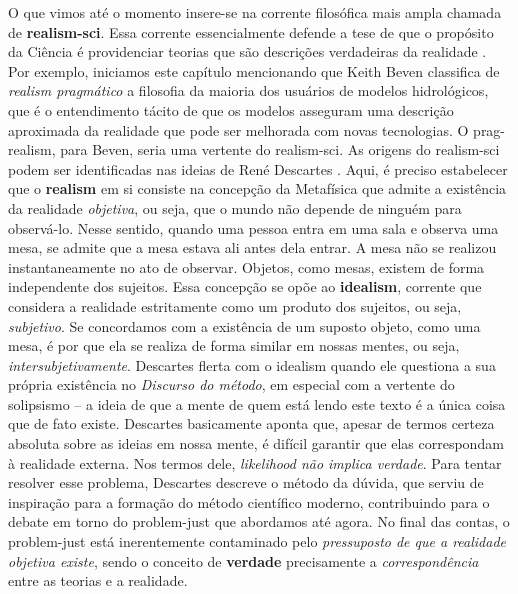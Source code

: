 \documentclass[./main.tex]{subfiles}
\begin{document}
\par O que vimos até o momento insere-se na corrente filosófica mais ampla chamada de \textbf{\gls{realism-sci}}. Essa corrente essencialmente defende a tese de que o propósito da Ciência é providenciar teorias que são descrições verdadeiras da realidade \cite{bas1980}. Por exemplo, iniciamos este capítulo mencionando que Keith Beven classifica de \textit{\gls{realism} pragmático} a filosofia da maioria dos usuários de modelos hidrológicos, que é o entendimento tácito de que os modelos asseguram uma descrição aproximada da realidade que pode ser melhorada com novas tecnologias. O \gls{prag-realism}, para Beven, seria uma vertente do \gls{realism-sci}. As origens do \gls{realism-sci} podem ser identificadas nas ideias de René Descartes \cite{Agazzi2017}. Aqui, é preciso estabelecer que o \textbf{\gls{realism}} em si consiste na concepção da Metafísica que admite a existência da realidade \textit{objetiva}, ou seja, que o mundo não depende de ninguém para observá-lo. Nesse sentido, quando uma pessoa entra em uma sala e observa uma mesa, se admite que a mesa estava ali antes dela entrar. A mesa não se realizou instantaneamente no ato de observar. Objetos, como mesas, existem de forma independente dos sujeitos. Essa concepção se opõe ao \textbf{\gls{idealism}}, corrente que considera a realidade estritamente como um produto dos sujeitos, ou seja, \textit{subjetivo}. Se concordamos com a existência de um suposto objeto, como uma mesa, é por que ela se realiza de forma similar em nossas mentes, ou seja, \textit{intersubjetivamente}. Descartes flerta com o \gls{idealism} quando ele questiona a sua própria existência no \textit{Discurso do método}, em especial com a vertente do solipsismo -- a ideia de que a mente de quem está lendo este texto é a única coisa que de fato existe. Descartes basicamente aponta que, apesar de termos certeza absoluta sobre as ideias em nossa mente, é difícil garantir que elas correspondam à realidade externa. Nos termos dele, \textit{\gls{likelihood} não implica verdade}. Para tentar resolver esse problema, Descartes descreve o método da dúvida, que serviu de inspiração para a formação do método científico moderno, contribuindo para o debate em torno do \gls{problem-just} que abordamos até agora. No final das contas, o \gls{problem-just} está inerentemente contaminado pelo \textit{pressuposto de que a realidade objetiva existe}, sendo o conceito de \textbf{verdade} precisamente a \textit{correspondência} entre as teorias e a realidade.
\end{document}
